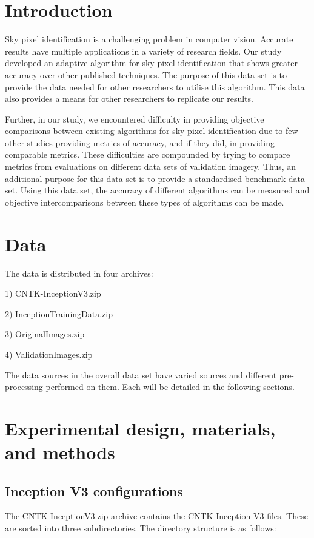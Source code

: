 \documentclass[final,3p,times,authoryear]{elsarticle}
\begin{document}
\section{Introduction}
\label{sec:introduction}
Sky pixel identification is a challenging problem in computer vision. Accurate results have multiple applications in a variety of research fields. Our study \citep{Nice2019UC} developed an adaptive algorithm for sky pixel identification that shows greater accuracy over other published techniques. The purpose of this data set is to provide the data needed for other researchers to utilise this algorithm. This data also provides a means for other researchers to replicate our results.

Further, in our study, we encountered difficulty in providing objective comparisons between existing algorithms for sky pixel identification due to few other studies providing metrics of accuracy, and if they did, in providing comparable metrics. These difficulties are compounded by trying to compare metrics from evaluations on different data sets of validation imagery. Thus, an additional purpose for this data set is to provide a standardised benchmark data set. Using this data set, the accuracy of different algorithms can be measured and objective intercomparisons between these types of algorithms can be made.




\section{Data}

The data is distributed in four archives: 

1) CNTK-InceptionV3.zip

2) InceptionTrainingData.zip

3) OriginalImages.zip

4) ValidationImages.zip

The data sources in the overall data set have varied sources and different pre-processing performed on them. Each will be detailed in the following sections.

\section{Experimental design, materials, and methods}
\label{sec:create}

\subsection{Inception V3 configurations}\label{sec:configuations}
The CNTK-InceptionV3.zip archive contains the CNTK Inception V3 files. These are sorted into three subdirectories. The directory structure is as follows:
\end{document}
